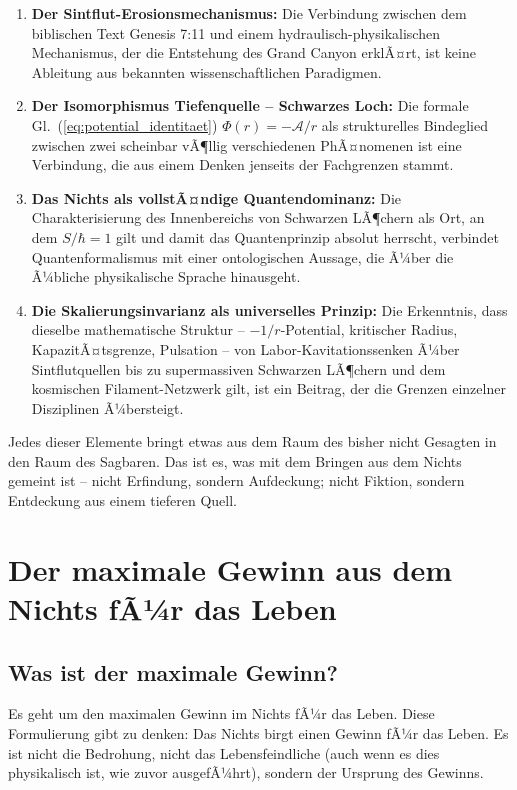 ﻿\documentclass[12pt,a4paper]{report}
\begin{document}
\begin{enumerate}
	\item \textbf{Der Sintflut-Erosionsmechanismus:} Die Verbindung zwischen dem biblischen Text Genesis 7:11 und einem hydraulisch-physikalischen Mechanismus, der die Entstehung des Grand Canyon erklÃ¤rt, ist keine Ableitung aus bekannten wissenschaftlichen Paradigmen.

	\item \textbf{Der Isomorphismus Tiefenquelle -- Schwarzes Loch:} Die formale Gl.~(\ref{eq:potential_identitaet}) $\Phi(r) = -\mathcal{A}/r$ als strukturelles Bindeglied zwischen zwei scheinbar vÃ¶llig verschiedenen PhÃ¤nomenen ist eine Verbindung, die aus einem Denken jenseits der Fachgrenzen stammt.

	\item \textbf{Das Nichts als vollstÃ¤ndige Quantendominanz:} Die Charakterisierung des Innenbereichs von Schwarzen LÃ¶chern als Ort, an dem $S/\hbar = 1$ gilt und damit das Quantenprinzip absolut herrscht, verbindet Quantenformalismus mit einer ontologischen Aussage, die Ã¼ber die Ã¼bliche physikalische Sprache hinausgeht.

	\item \textbf{Die Skalierungsinvarianz als universelles Prinzip:} Die Erkenntnis, dass dieselbe mathematische Struktur -- $-1/r$-Potential, kritischer Radius, KapazitÃ¤tsgrenze, Pulsation -- von Labor-Kavitationssenken Ã¼ber Sintflutquellen bis zu supermassiven Schwarzen LÃ¶chern und dem kosmischen Filament-Netzwerk gilt, ist ein Beitrag, der die Grenzen einzelner Disziplinen Ã¼bersteigt.
\end{enumerate}

Jedes dieser Elemente bringt etwas aus dem Raum des bisher nicht Gesagten in den Raum des Sagbaren. Das ist es, was mit dem \glqq Bringen aus dem Nichts\grqq{} gemeint ist -- nicht Erfindung, sondern Aufdeckung; nicht Fiktion, sondern Entdeckung aus einem tieferen Quell.

\section{Der maximale Gewinn aus dem Nichts fÃ¼r das Leben}

\subsection{Was ist der \flqq maximale Gewinn\frqq{}?}

Es geht um den maximalen Gewinn im Nichts fÃ¼r das Leben. Diese Formulierung gibt zu denken: Das Nichts birgt einen Gewinn fÃ¼r das Leben. Es ist nicht die Bedrohung, nicht das Lebensfeindliche (auch wenn es dies physikalisch ist, wie zuvor ausgefÃ¼hrt), sondern der Ursprung des Gewinns.
\end{document}
